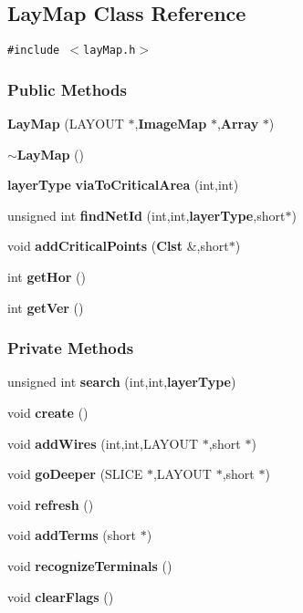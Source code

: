 \subsection{Lay\-Map  Class Reference}
\label{LayMap}
{\tt \#include $<$lay\-Map.h$>$}

\subsubsection*{Public Methods}
\begin{CompactItemize}
\item 
{\bf Lay\-Map} (LAYOUT $\ast$,{\bf Image\-Map} $\ast$,{\bf Array} $\ast$)
\item 
{\bf $\sim$Lay\-Map} ()
\item 
{\bf layer\-Type} {\bf via\-To\-Critical\-Area} (int,int)
\item 
unsigned int {\bf find\-Net\-Id} (int,int,{\bf layer\-Type},short$\ast$)
\item 
void {\bf add\-Critical\-Points} ({\bf Clst} \&,short$\ast$)
\item 
int {\bf get\-Hor} ()
\item 
int {\bf get\-Ver} ()
\end{CompactItemize}
\subsubsection*{Private Methods}
\begin{CompactItemize}
\item 
unsigned int {\bf search} (int,int,{\bf layer\-Type})
\item 
void {\bf create} ()
\item 
void {\bf add\-Wires} (int,int,LAYOUT $\ast$,short $\ast$)
\item 
void {\bf go\-Deeper} (SLICE $\ast$,LAYOUT $\ast$,short $\ast$)
\item 
void {\bf refresh} ()
\item 
void {\bf add\-Terms} (short $\ast$)
\item 
void {\bf recognize\-Terminals} ()
\item 
void {\bf clear\-Flags} ()
\end{CompactItemize}
